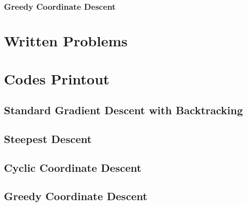 \documentclass[11pt,a4paper]{article}
\begin{document}
\subsubsection{Greedy Coordinate Descent}

\newpage
\section{Written Problems}


\newpage
\appendix
\section{Codes Printout}

\subsection{Standard Gradient Descent with Backtracking}
%
\newpage

\subsection{Steepest Descent}
%
\newpage

\subsection{Cyclic Coordinate Descent}
%
\newpage

\subsection{Greedy Coordinate Descent}
%
\newpage
\end{document}
